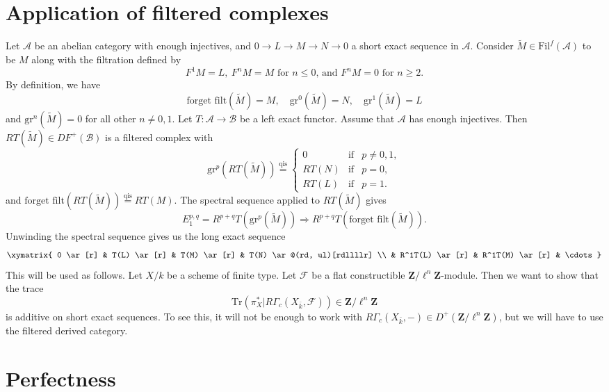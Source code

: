 \section{Application of filtered complexes}
\label{section-applications-filtered}

\noindent
Let $\mathcal{A}$ be an abelian category with enough injectives, and
$0 \to L \to M \to N \to 0$ a short exact sequence in $\mathcal{A}$.
Consider $\widetilde M \in \text{Fil}^f(\mathcal{A})$ to be $M$ along with the
filtration defined by
$$
F^1M = L, \ F^nM = M
\text{ for $n \leq 0$, and $F^nM = 0$ for $n \geq 2$.}
$$
By definition, we have
$$
\text{forget filt}(\widetilde M) = M, \quad
\text{gr}^0(\widetilde M) = N, \quad
\text{gr}^1(\widetilde M) = L
$$
and $\text{gr}^n(\widetilde M) = 0$ for all other $n \neq 0, 1$. Let $T:
\mathcal{A} \to \mathcal{B}$ be a left exact functor. Assume that $\mathcal{A}$
has enough injectives. Then $RT(\widetilde M) \in D F^+(\mathcal{B})$ is a
filtered complex with
$$
\text{gr}^p(RT(\widetilde M)) \stackrel {\mathrm{qis}}{=} \left \{
\begin{matrix}
0 & \text{if} & p \neq 0, 1, \\
RT(N) & \text{if} & p = 0, \\
RT(L) & \text{if} & p = 1.
\end{matrix}
\right .
$$
and $\text{forget filt}(RT(\widetilde M))\stackrel{\text{qis}}{ = } RT(M)$. The
spectral sequence applied to $RT(\widetilde M)$ gives
$$
E_1^{p, q} = R^{p+q}T(\mathrm{gr}^p(\widetilde M)) \Rightarrow
R^{p+q}T(\text{forget filt}(\widetilde M)).
$$
Unwinding the spectral sequence gives us the long exact sequence
$$
\xymatrix{
0 \ar[r] & T(L) \ar[r] & T(M) \ar[r] & T(N) \ar@(rd, ul)[rdllllr] \\
& R^1T(L) \ar[r] & R^1T(M) \ar[r] & \cdots
}
$$
This will be used as follows. Let $X/k$ be a scheme of finite type. Let
$\mathcal{F}$ be a flat constructible $\mathbf{Z}/\ell^n \mathbf{Z}$-module.
Then we want to show that the trace
$$
\text{Tr}( \pi_X^\ast | R\Gamma_c(X_{\bar k}, \mathcal{F})) \in
\mathbf{Z}/\ell^n \mathbf{Z}
$$
is additive on short exact sequences. To see this, it will not be enough to
work with $R\Gamma_c(X_{\bar k}, -) \in D^+(\mathbf{Z}/\ell^n \mathbf{Z})$, but
we will have to use the filtered derived category.







\section{Perfectness}
\label{section-perfect}

